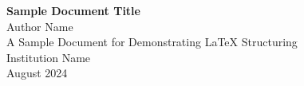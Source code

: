 \begin{titlepage}
    \centering
    {\Huge \textbf{Sample Document Title}} \\
    \vspace{2cm}
    {\Large Author Name} \\
    \vspace{1.5cm}
    {\large A Sample Document for Demonstrating LaTeX Structuring} \\
    \vspace{1.5cm}
    {\Large Institution Name} \\
    \vspace{1cm}
    {\large August 2024} \\
\end{titlepage}